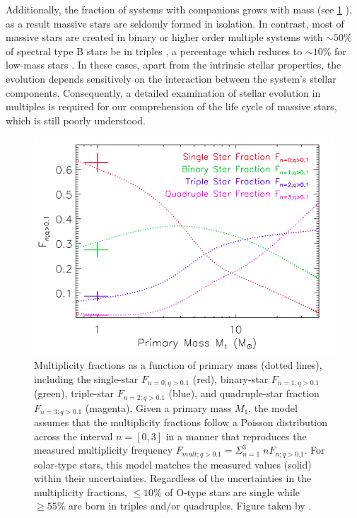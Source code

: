 Additionally, the fraction of systems with companions grows with mass (see \cref{fig:stellar_companions} ), as a result massive stars are seldomly formed in isolation. In contrast, most of massive stars are created in binary or higher order multiple systems with $\sim 50\%$ of spectral type B stars be in triples \citep{sana2014southern,moe2017mind}, a percentage which reduces to $\sim 10\%$ for low-mass stars \citep{raghavan2010survey,toonen2014popcorn,moe2017mind}. In these cases, apart from the intrinsic stellar properties, the evolution depends sensitively on the interaction between the system's stellar components. Consequently, a detailed examination of stellar evolution in multiples is required for our comprehension of the life cycle of massive stars, which is still poorly understood.
\begin{figure}[H]
    \centering
    \includegraphics[width=\textwidth]{Thesis/figures/fig_moe_2017.png}
    \caption{Multiplicity fractions as a function of primary mass (dotted lines), including the single-star $F_{n=0;q> 0.1}$ (red), binary-star $F_{n=1;q> 0.1}$  (green), triple-star $F_{n=2;q> 0.1}$  (blue), and quadruple-star fraction $F_{n=3;q> 0.1}$  (magenta). Given a primary mass $M_1$, the model assumes that the multiplicity fractions follow a Poisson distribution across the interval $n = [0, 3]$ in a manner that reproduces the measured multiplicity frequency $F_{mult;q >0.1} = \Sigma_{n=1}^3 \; n F_{n;q> 0.1}$. For solar-type stars, this model matches the measured values (solid) within their uncertainties. Regardless of the uncertainties in the multiplicity fractions, $\leq 10\%$ of O-type stars are single while $\geq 55\%$ are born in triples and/or quadruples. Figure taken by \cite{moe2017mind}.}
    \label{fig:stellar_companions}
\end{figure}
